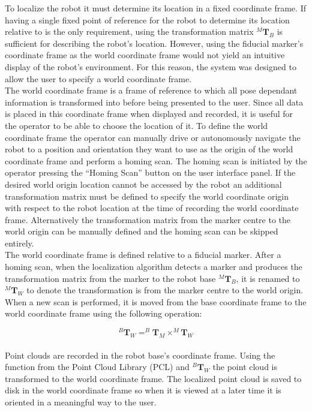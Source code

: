 To localize the robot it must determine its location in a fixed coordinate frame. If having a single fixed point of reference for the robot to determine its location relative to is the only requirement, using the transformation matrix $^{M}\mathbf{T}_{B}$ is sufficient for describing the robot's location. However, using the fiducial marker's coordinate frame as the world coordinate frame would not yield an intuitive display of the robot's environment. For this reason, the system was designed to allow the user to specify a world coordinate frame.\\

The world coordinate frame is a frame of reference to which all pose dependant information is transformed into before being presented to the user. Since all data is placed in this coordinate frame when displayed and recorded, it is useful for the operator to be able to choose the location of it. To define the world coordinate frame the operator can manually drive or autonomously navigate the robot to a position and orientation they want to use as the origin of the world coordinate frame and perform a homing scan. The homing scan is initiated by the operator pressing the ``Homing Scan'' button on the user interface panel. If the desired world origin location cannot be accessed by the robot an additional transformation matrix must be defined to specify the world coordinate origin with respect to the robot location at the time of recording the world coordinate frame. Alternatively the transformation matrix from the marker centre to the world origin can be manually defined and the homing scan can be skipped entirely.\\

The world coordinate frame is defined relative to a fiducial marker. After a homing scan, when the localization algorithm detects a marker and produces the transformation matrix from the marker to the robot base $^{M}\mathbf{T}_{B}$, it is renamed to $^{M}\mathbf{T}_{W}$ to denote the transformation is from the marker centre to the world origin. When a new scan is performed, it is moved from the base coordinate frame to the world coordinate frame using the following operation:

\begin{equation}
    ^{B}\mathbf{T}_{W} = ^{B}\mathbf{T}_{M}\times^{M}\mathbf{T}_{W}
\end{equation}\\

Point clouds are recorded in the robot base's coordinate frame. Using the function  from the Point Cloud Library (PCL) and $^{B}\mathbf{T}_{W}$ the point cloud is transformed to the world coordinate frame. The localized point cloud is saved to disk in the world coordinate frame so when it is viewed at a later time it is oriented in a meaningful way to the user.\\

